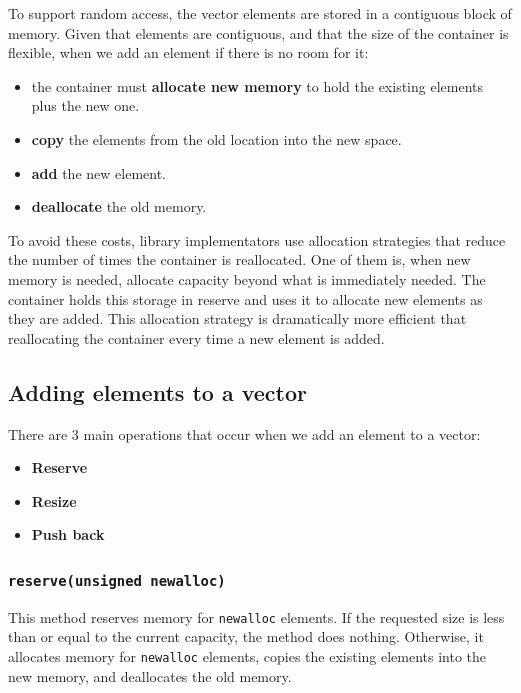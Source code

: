 To support random access, the vector elements are stored in a contiguous block of memory. Given that
elements are contiguous, and that the size of the container is flexible, when we add an element if
there is no room for it:

\begin{itemize}
    \item the container must \textbf{allocate new memory} to hold the existing elements plus the
    new one.
    
    \item \textbf{copy} the elements from the old location into the new space.
    
    \item \textbf{add} the new element.
    
    \item \textbf{deallocate} the old memory.
\end{itemize}

To avoid these costs, library implementators use allocation strategies that reduce the number of
times the container is reallocated. One of them is, when new memory is needed, allocate capacity
beyond what is immediately needed. The container holds this storage in reserve and uses it to
allocate new elements as they are added. This allocation strategy is dramatically more efficient
that reallocating the container every time a new element is added.\\

\subsection{Adding elements to a vector}

There are 3 main operations that occur when we add an element to a vector:

\begin{itemize}
    \item \textbf{Reserve}
    \item \textbf{Resize}
    \item \textbf{Push back}
\end{itemize}

\subsubsection{\texttt{reserve(unsigned newalloc)}}

This method reserves memory for \texttt{newalloc} elements. If the requested size is less than
or equal to the current capacity, the method does nothing. Otherwise, it allocates memory for
\texttt{newalloc} elements, copies the existing elements into the new memory, and deallocates
the old memory.\\

